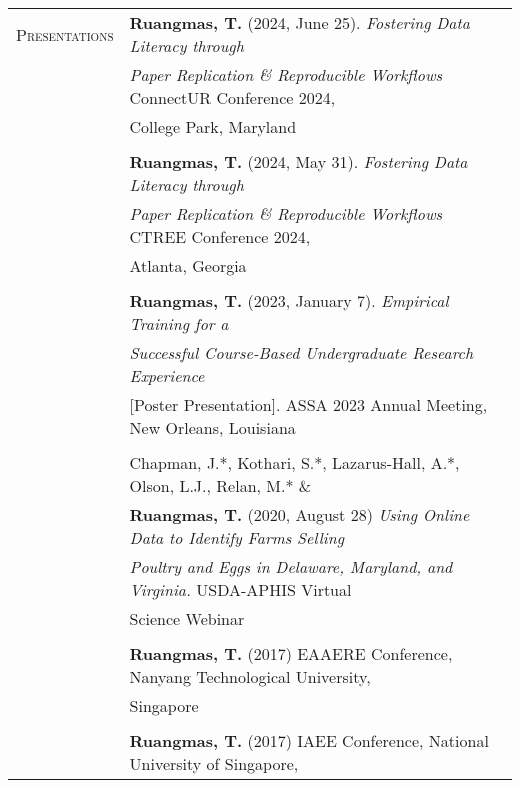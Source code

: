 \documentclass[letterpaper,11pt,oneside]{article}\usepackage[]{graphicx}\usepackage[]{xcolor}
\begin{document}
\newpage
\noindent \begin{tabular}{p{1.2in} l}                           
\textsc{Presentations} & \textbf{Ruangmas, T.} (2024, June 25). \textit{Fostering Data Literacy through} \\
                        & \textit{Paper Replication \& Reproducible Workflows} ConnectUR Conference 2024, \\
                        & College Park, Maryland  \href{https://drive.google.com/file/d/1sWazDSKhvuPo2vBjK3psZ5JWO0LkyMRQ/view?usp=drive_link}{\color{blue}{[SLIDES]}}\\
                        & \\
                        & \textbf{Ruangmas, T.} (2024, May 31). \textit{Fostering Data Literacy through}\\
                        & \textit{Paper Replication \& Reproducible Workflows} CTREE Conference 2024, \\
                        & Atlanta, Georgia\\
                        & \\
                        & \textbf{Ruangmas, T.} (2023, January 7). \textit{Empirical Training for a }\\
                        & \textit{Successful Course-Based Undergraduate Research Experience} \\
                        & [Poster Presentation]. ASSA 2023 Annual Meeting, New Orleans, Louisiana\\
                        & \\
                        & Chapman, J.*, Kothari, S.*, Lazarus-Hall, A.*, Olson, L.J., Relan, M.* \& \\
                        & \textbf{Ruangmas, T.} (2020, August 28) \textit{Using Online Data to Identify Farms Selling}\\
                        & \textit{Poultry and Eggs in Delaware, Maryland, and Virginia.} USDA-APHIS Virtual\\
                        & Science Webinar\\
	                      & \\
                        & \textbf{Ruangmas, T.} (2017) EAAERE Conference, Nanyang Technological University, \\
                        & Singapore \\
	                      & \\
                        & \textbf{Ruangmas, T.} (2017) IAEE Conference, National University of Singapore, \\

\end{tabular}
\end{document}
